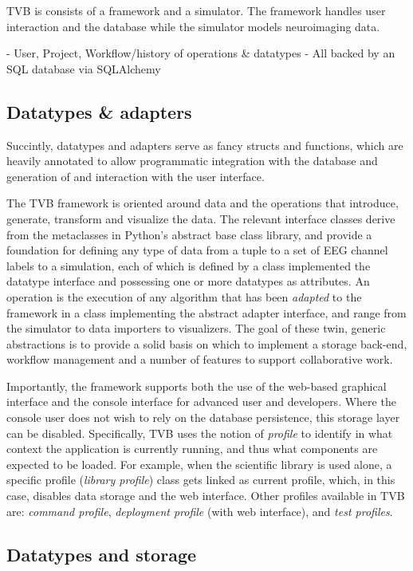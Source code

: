 \documentclass{bioinfo}
\begin{document}
TVB is consists of a framework and a simulator. The framework handles user
interaction and the database while the simulator models neuroimaging data. 

- User, Project, Workflow/history of operations \& datatypes
- All backed by an SQL database via SQLAlchemy

\subsection{Datatypes \& adapters}

Succintly, datatypes and adapters serve as fancy structs and functions, which
are heavily annotated to allow programmatic integration with the database and
generation of and interaction with the user interface.

The TVB framework is oriented around data and the operations that introduce,
generate, transform and visualize the data. The relevant interface classes
derive from the metaclasses in Python's abstract base class library, and
provide a foundation for defining any type of data from a tuple to a
set of EEG channel labels to a simulation, each of which is defined by a class
implemented the datatype interface and possessing one or more datatypes as 
attributes. An operation is the execution of any algorithm that
has been \emph{adapted} to the framework in a class implementing the abstract
adapter interface, and range from the simulator to data importers to
visualizers.  The goal of these twin, generic abstractions is to provide a
solid basis on which to implement a storage back-end, workflow management and a
number of features to support collaborative work. 

Importantly, the framework supports both the use of the web-based graphical
interface and the console interface for advanced user and developers. Where the
console user does not wish to rely on the database persistence, this storage
layer can be disabled. Specifically, TVB uses the notion of \emph{profile} to
identify in what context the application is currently running, and thus what
components are expected to be loaded.  For example, when the scientific library
is used alone, a specific profile (\emph{library profile}) class gets linked as
current profile, which, in this case, disables data storage and the web
interface. Other profiles available in TVB are: \emph{command profile},
\emph{deployment profile} (with web interface), and \emph{test profiles}.

\subsection{Datatypes and storage}
\end{document}
